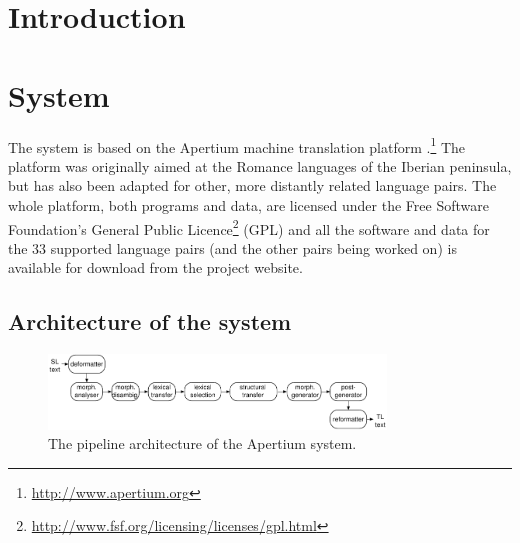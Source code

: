 \documentclass[10pt,a5paper,twoside]{article}
\begin{document}



\newpage
\section{Introduction}

\section{System}
The system is based on the Apertium machine translation platform \citep{apertium/2011}.\footnote{\url{http://www.apertium.org}} The platform was originally aimed at the Romance languages of the Iberian peninsula, but has also been adapted for other, more distantly related language pairs. The whole platform, both programs and data, are licensed under the Free Software Foundation's General Public Licence\footnote{\url{http://www.fsf.org/licensing/licenses/gpl.html}} (GPL) and all the software and data for the 33 supported language pairs (and the other pairs being worked on) is available for download from the project website.

\subsection{Architecture of the system}

\begin{figure}[htbp]
\begin{center}
 \includegraphics[width=0.8\textwidth]{architecture.pdf}
\end{center}
\caption{The pipeline architecture of the Apertium system.}
\label{fig:modules}
\end{figure}
\end{document}
